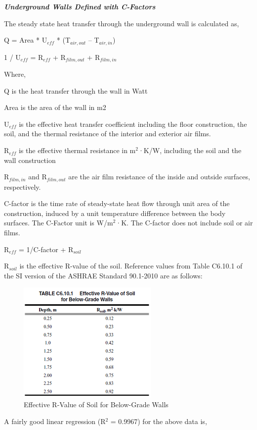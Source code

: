 \textbf{\emph{Underground Walls Defined with C-Factors}}

The steady state heat transfer through the underground wall is calculated as,

Q = Area * U\(_{eff}\) * (T\(_{air,out}\) -- T\(_{air,in}\))

1 / U\(_{eff}\) = R\(_{eff}\) + R\(_{film,out}\) + R\(_{film,in}\)

Where,

Q is the heat transfer through the wall in Watt

Area is the area of the wall in m2

U\(_{eff}\) is the effective heat transfer coefficient including the floor construction, the soil, and the thermal resistance of the interior and exterior air films.

R\(_{eff}\) is the effective thermal resistance in m\(^{2}\)·K/W, including the soil and the wall construction

R\(_{film,in}\) and R\(_{film,out}\) are the air film resistance of the inside and outside surfaces, respectively.

C-factor is the time rate of steady-state heat flow through unit area of the construction, induced by a unit temperature difference between the body surfaces. The C-Factor unit is W/m\(^{2}\)·K. The C-factor does not include soil or air films.

R\(_{eff}\) = 1/C-factor + R\(_{soil}\)

R\(_{soil}\) is the effective R-value of the soil. Reference values from Table C6.10.1 of the SI version of the ASHRAE Standard 90.1-2010 are as follows:

\begin{figure}[htbp]
\centering
\includegraphics{media/image436.png}
\caption{Effective R-Value of Soil for Below-Grade Walls}
\end{figure}

A fairly good linear regression (R\(^{2}\) = 0.9967) for the above data is,

